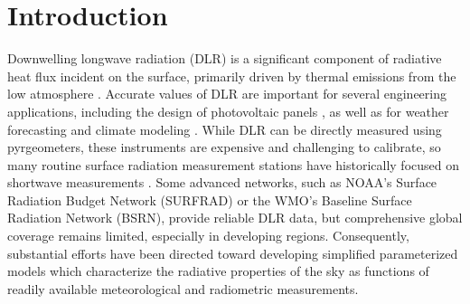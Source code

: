 \documentclass[preprint,12pt]{elsarticle}
\begin{document}


\section{Introduction}
\label{sec1}

Downwelling longwave radiation (DLR) is a significant component of radiative heat flux incident on the surface, primarily driven by thermal emissions from the low atmosphere \cite{idso1969thermal,grobner2009effective,alados2012estimation}. 
Accurate values of DLR are important for several engineering applications, including the design of photovoltaic panels \cite{duffie2013solar}, as well as for weather forecasting and climate modeling \cite{trenberth2009earth,wild2017new}. %
While DLR can be directly measured using pyrgeometers, these instruments are expensive and challenging to calibrate, so many routine surface radiation measurement stations have historically focused on shortwave measurements \citep{gilgen1998means,wang2009global,stephens2012global,wang2013global}. Some advanced networks, such as NOAA's Surface Radiation Budget Network (SURFRAD) or the WMO's Baseline Surface Radiation Network (BSRN), provide reliable DLR data, but comprehensive global coverage remains limited, especially in developing regions. %
Consequently, substantial efforts have been directed toward developing simplified parameterized models which characterize the radiative properties of the sky as functions of readily available meteorological and radiometric measurements.  

\end{document}

